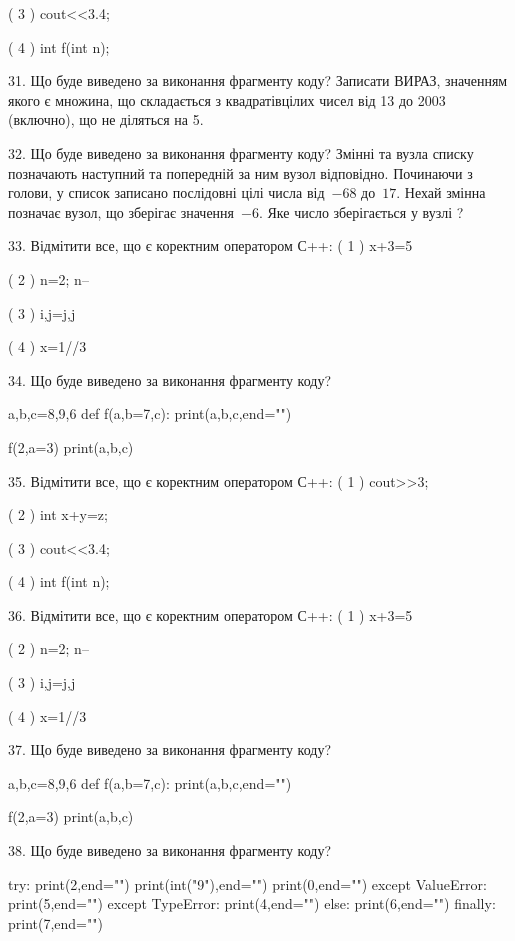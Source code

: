 \documentclass[11pt]{article}
\begin{document}
( 3 ) cout<<3.4;

( 4 ) int f(int n);

31. Що буде виведено за виконання фрагменту коду?
Записати ВИРАЗ, значенням якого є множина, що складається з квадратівцілих чисел від 13 до 2003 (включно), що не діляться на 5.

32. Що буде виведено за виконання фрагменту коду?
Змінні  та  вузла списку позначають наступний та попередній за ним вузол відповідно. Починаючи з голови, у список записано послідовні цілі числа від~$-68$ до~$17$. Нехай змінна  позначає вузол, що зберігає значення~$-6$.
Яке число зберігається у вузлі  ?

33. Відмітити все, що є коректним оператором С++:
( 1 ) x+3=5

( 2 ) n=2; n--

( 3 ) i,j=j,j

( 4 ) x=1//3

34. Що буде виведено за виконання фрагменту коду?

a,b,c=8,9,6
def f(a,b=7,c):
    print(a,b,c,end="")

f(2,a=3)
print(a,b,c)


35. Відмітити все, що є коректним оператором С++:
( 1 ) cout>>3;

( 2 ) int x+y=z;

( 3 ) cout<<3.4;

( 4 ) int f(int n);

36. Відмітити все, що є коректним оператором С++:
( 1 ) x+3=5

( 2 ) n=2; n--

( 3 ) i,j=j,j

( 4 ) x=1//3

37. Що буде виведено за виконання фрагменту коду?

a,b,c=8,9,6
def f(a,b=7,c):
    print(a,b,c,end="")

f(2,a=3)
print(a,b,c)


38. Що буде виведено за виконання фрагменту коду?

try:
    print(2,end="")
    print(int("9"),end="")
    print(0,end="")
except ValueError: print(5,end="")
except TypeError: print(4,end="")
else: print(6,end="")
finally: print(7,end="")
\end{document}
